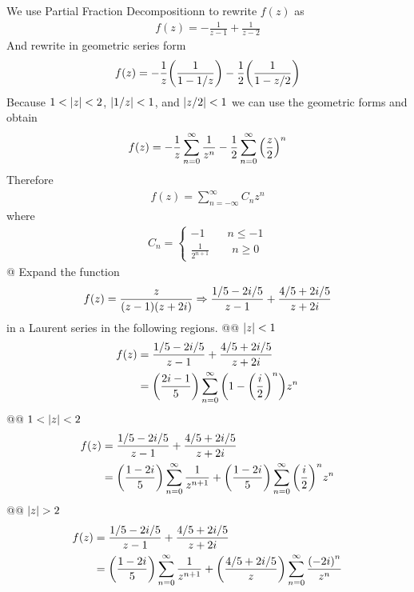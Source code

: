 \begin{easylist}[itemize]
        We use Partial Fraction Decompositionn to rewrite $f(z)$ as
        \begin{align*}
            f(z) = -\frac{1}{z-1} + \frac{1}{z-2}
        \end{align*}
        And rewrite in geometric series form
        \begin{align*}
            f(z) = -\frac{1}{z}{\left( \frac{1}{1 - 1/z} \right)} - \frac{1}{2}
            {\left( \frac{1}{1 - z/2} \right)}
        \end{align*}
        Because $1<\left\lvert z \right\rvert<2$, $\left\lvert 1/z \right\rvert<1$, and $\left\lvert z/2 \right\rvert<1$ we can use
        the geometric forms and obtain
        \begin{align*}
            f(z) = -\frac{1}{z} \sum_{n=0}^\infty \frac{1}{z^n} -
            \frac{1}{2} \sum_{n=0}^\infty {\left( \frac{z}{2} \right)}^n
        \end{align*}
        Therefore
        \begin{align*}
            f(z) = \sum_{n=-\infty}^\infty C_n z^n
        \end{align*}
        where
        \begin{align*}
            C_n = \begin{cases}
                -1 \qquad n \le -1\\
                \frac{1}{2^{n+1}} \qquad n \ge 0
            \end{cases}
        \end{align*}
        @ Expand the function
        \begin{align*}
            f(z) = \frac{z}{{\left( z-1 \right)}{\left( z+2i \right)}} \Rightarrow
            \frac{1/5 - 2i/5}{z-1} + \frac{4/5 + 2i/5}{z+2i}
        \end{align*}
        in a Laurent series in the following regions.
        @@ $\left\lvert z \right\rvert<1$
        \begin{align*}
            f(z) &= 
            \frac{1/5 - 2i/5}{z-1} + \frac{4/5 + 2i/5}{z+2i}\\
            &= {\left( \frac{2i-1}{5} \right)} \sum_{n=0}^\infty
                {\left( 1-{\left( \frac{i}{2} \right)}^n \right)}z^n
        \end{align*}
        @@ $1 < \left\lvert z \right\rvert < 2$
        \begin{align*}
            f(z) &= 
            \frac{1/5 - 2i/5}{z-1} + \frac{4/5 + 2i/5}{z+2i}\\
            &= {\left( \frac{1-2i}{5} \right)} \sum_{n=0}^\infty \frac{1}{z^{n+1}} +
            {\left( \frac{1-2i}{5} \right)} \sum_{n=0}^\infty {\left( \frac{i}{2} \right)}^nz^n
        \end{align*}
        @@ $\left\lvert z \right\rvert > 2$
        \begin{align*}
            f(z) &= 
            \frac{1/5 - 2i/5}{z-1} + \frac{4/5 + 2i/5}{z+2i}\\
            &= {\left( \frac{1-2i}{5} \right)}\sum_{n=0}^\infty \frac{1}{z^{n+1}} +
            {\left( \frac{4/5 + 2i/5}{z} \right)}\sum_{n=0}^\infty
            \frac{{\left( -2i \right)}^n}{z^n}
        \end{align*}
    \end{easylist}

